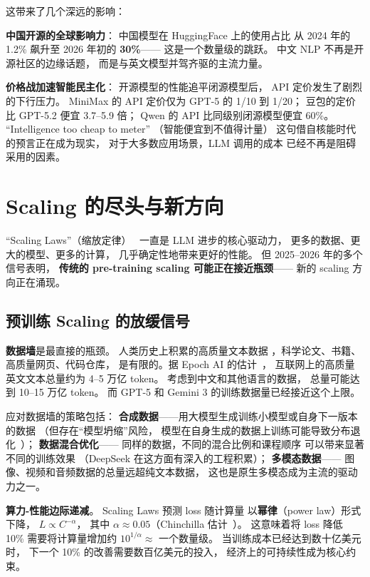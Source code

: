 这带来了几个深远的影响：

\textbf{中国开源的全球影响力}：
中国模型在 HuggingFace 上的使用占比
从 2024 年的 1.2\% 飙升至 2026 年初的 \textbf{30\%}——
这是一个数量级的跳跃。
中文 NLP 不再是开源社区的边缘话题，
而是与英文模型并驾齐驱的主流力量。

\textbf{价格战加速智能民主化}：
开源模型的性能追平闭源模型后，
API 定价发生了剧烈的下行压力。
MiniMax 的 API 定价仅为 GPT-5 的 1/10 到 1/20；
豆包的定价比 GPT-5.2 便宜 3.7--5.9 倍；
Qwen 的 API 比同级别闭源模型便宜 60\%。
“Intelligence too cheap to meter”
（智能便宜到不值得计量）
这句借自核能时代的预言正在成为现实，
对于大多数应用场景，LLM 调用的成本
已经不再是阻碍采用的因素。

\section{Scaling 的尽头与新方向}
\label{sec:scaling-new-directions}

“Scaling Laws”（缩放定律）~\cite{kaplan2020scaling,hoffmann2022chinchilla}
一直是 LLM 进步的核心驱动力，
更多的数据、更大的模型、更多的计算，
几乎确定性地带来更好的性能。
但 2025--2026 年的多个信号表明，
\textbf{传统的 pre-training scaling 可能正在接近瓶颈}——
新的 scaling 方向正在涌现。

\subsection{预训练 Scaling 的放缓信号}

\textbf{数据墙}是最直接的瓶颈。
人类历史上积累的高质量文本数据
，科学论文、书籍、高质量网页、代码仓库，
是有限的。据 Epoch AI 的估计~\cite{villalobos2024position}，
互联网上的高质量英文文本总量约为 4--5 万亿 token。
考虑到中文和其他语言的数据，
总量可能达到 10--15 万亿 token。
而 GPT-5 和 Gemini 3 的训练数据量已经接近这个上限。

应对数据墙的策略包括：
\textbf{合成数据}——用大模型生成训练小模型或自身下一版本的数据
（但存在“模型坍缩”风险，
模型在自身生成的数据上训练可能导致分布退化~\cite{shumailov2024curse}）；
\textbf{数据混合优化}——
同样的数据，不同的混合比例和课程顺序
可以带来显著不同的训练效果
（DeepSeek 在这方面有深入的工程积累）；
\textbf{多模态数据}——
图像、视频和音频数据的总量远超纯文本数据，
这也是原生多模态成为主流的驱动力之一。

\textbf{算力-性能边际递减}。
Scaling Laws 预测 loss 随计算量
以\textbf{幂律}（power law）形式下降，
$L \propto C^{-\alpha}$，
其中 $\alpha \approx 0.05$（Chinchilla 估计~\cite{hoffmann2022chinchilla}）。
这意味着将 loss 降低 10\%
需要将计算量增加约 $10^{1/\alpha} \approx$ 一个数量级。
当训练成本已经达到数十亿美元时，
下一个 10\% 的改善需要数百亿美元的投入，
经济上的可持续性成为核心约束。

